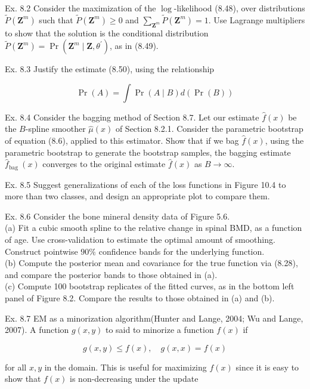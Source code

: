 \documentclass[10pt]{article}
\begin{document}
Ex. 8.2 Consider the maximization of the $\log$-likelihood (8.48), over distributions $\tilde{P}\left(\mathbf{Z}^{m}\right)$ such that $\tilde{P}\left(\mathbf{Z}^{m}\right) \geq 0$ and $\sum_{\mathbf{Z}^{m}} \tilde{P}\left(\mathbf{Z}^{m}\right)=1$. Use Lagrange multipliers to show that the solution is the conditional distribution $\tilde{P}\left(\mathbf{Z}^{m}\right)=\operatorname{Pr}\left(\mathbf{Z}^{m} \mid \mathbf{Z}, \theta^{\prime}\right)$, as in (8.49).

Ex. 8.3 Justify the estimate (8.50), using the relationship

$$
\operatorname{Pr}(A)=\int \operatorname{Pr}(A \mid B) d(\operatorname{Pr}(B))
$$

Ex. 8.4 Consider the bagging method of Section 8.7. Let our estimate $\hat{f}(x)$ be the $B$-spline smoother $\hat{\mu}(x)$ of Section 8.2.1. Consider the parametric bootstrap of equation (8.6), applied to this estimator. Show that if we bag $\hat{f}(x)$, using the parametric bootstrap to generate the bootstrap samples, the bagging estimate $\hat{f}_{\text {bag }}(x)$ converges to the original estimate $\hat{f}(x)$ as $B \rightarrow \infty$.

Ex. 8.5 Suggest generalizations of each of the loss functions in Figure 10.4 to more than two classes, and design an appropriate plot to compare them.

Ex. 8.6 Consider the bone mineral density data of Figure 5.6.\\
(a) Fit a cubic smooth spline to the relative change in spinal BMD, as a function of age. Use cross-validation to estimate the optimal amount of smoothing. Construct pointwise $90 \%$ confidence bands for the underlying function.\\
(b) Compute the posterior mean and covariance for the true function via (8.28), and compare the posterior bands to those obtained in (a).\\
(c) Compute 100 bootstrap replicates of the fitted curves, as in the bottom left panel of Figure 8.2. Compare the results to those obtained in (a) and (b).

Ex. 8.7 EM as a minorization algorithm(Hunter and Lange, 2004; Wu and Lange, 2007). A function $g(x, y)$ to said to minorize a function $f(x)$ if


\begin{equation*}
g(x, y) \leq f(x), \quad g(x, x)=f(x) \tag{8.62}
\end{equation*}


for all $x, y$ in the domain. This is useful for maximizing $f(x)$ since it is easy to show that $f(x)$ is non-decreasing under the update
\end{document}

